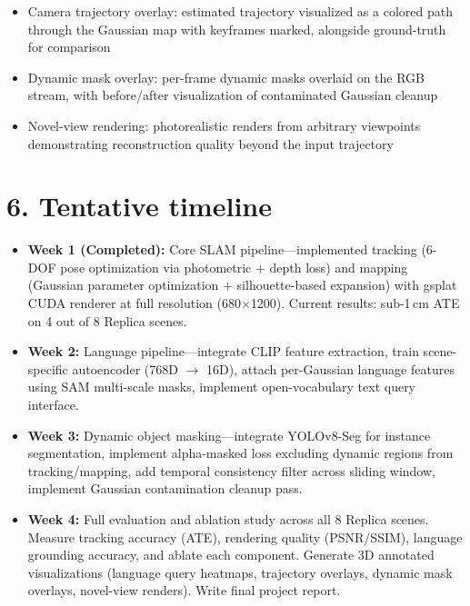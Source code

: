 \documentclass[11pt,letterpaper]{article}
\begin{document}
\begin{itemize}[nosep]
\begin{itemize}[nosep]
        \item Camera trajectory overlay: estimated trajectory visualized as a colored path through the Gaussian map with keyframes marked, alongside ground-truth for comparison
        \item Dynamic mask overlay: per-frame dynamic masks overlaid on the RGB stream, with before/after visualization of contaminated Gaussian cleanup
        \item Novel-view rendering: photorealistic renders from arbitrary viewpoints demonstrating reconstruction quality beyond the input trajectory
    \end{itemize}
\end{itemize}

\section*{6. Tentative timeline}

\begin{itemize}[nosep]
    \item \textbf{Week 1 (Completed):} Core SLAM pipeline---implemented tracking (6-DOF pose optimization via photometric + depth loss) and mapping (Gaussian parameter optimization + silhouette-based expansion) with gsplat CUDA renderer at full resolution (680$\times$1200). Current results: sub-1\,cm ATE on 4 out of 8 Replica scenes.

    \item \textbf{Week 2:} Language pipeline---integrate CLIP feature extraction, train scene-specific autoencoder (768D $\rightarrow$ 16D), attach per-Gaussian language features using SAM multi-scale masks, implement open-vocabulary text query interface.

    \item \textbf{Week 3:} Dynamic object masking---integrate YOLOv8-Seg for instance segmentation, implement alpha-masked loss excluding dynamic regions from tracking/mapping, add temporal consistency filter across sliding window, implement Gaussian contamination cleanup pass.

    \item \textbf{Week 4:} Full evaluation and ablation study across all 8 Replica scenes. Measure tracking accuracy (ATE), rendering quality (PSNR/SSIM), language grounding accuracy, and ablate each component. Generate 3D annotated visualizations (language query heatmaps, trajectory overlays, dynamic mask overlays, novel-view renders). Write final project report.
\end{itemize}
\end{document}
